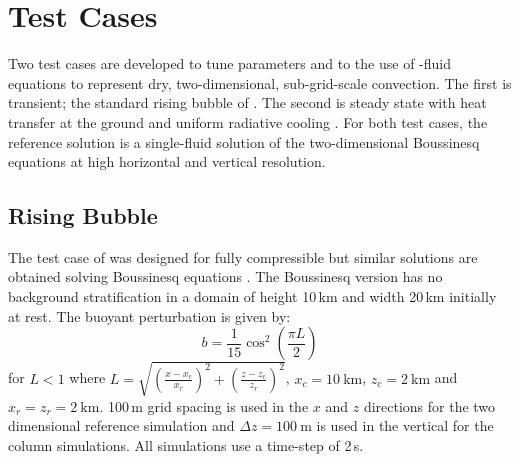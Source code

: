\documentclass[draft]{agujournal2019}
\begin{document}
\section{\label{sec:results} Test Cases}

Two test cases are developed to tune parameters and to  the
use of -fluid equations to represent dry, two-dimensional, sub-grid-scale
convection. The first is transient; the standard rising bubble of
.  The second  is steady state with heat transfer at
the ground and uniform radiative cooling . For both test cases, the
reference solution is a single-fluid solution of the two-dimensional
Boussinesq equations at high horizontal and vertical resolution.   

\subsection{Rising Bubble}

The  test case of  was designed for fully compressible
 but similar solutions are obtained solving  Boussinesq equations .
The Boussinesq version has no background stratification in a domain
of height 10\,km and width 20\,km initially at rest. The buoyant
perturbation is given by:
\begin{equation}
b=\frac{1}{15}\cos^{2}\left(\frac{\pi L}{2}\right)\label{eq:thetaPerturb}
\end{equation}
for $L<1$ where $L=\sqrt{\left(\frac{x-x_{c}}{x_{r}}\right)^{2}+\left(\frac{z-z_{c}}{z_{r}}\right)^{2}}$,
$x_{c}=10\ \text{km}$, $z_{c}=2\ \text{km}$ and $x_{r}=z_{r}=2\ \text{km}$.
100\,m grid spacing is used in the $x$ and $z$ directions for the
two dimensional reference simulation and $\Delta z=100\ \text{m}$
is used in the vertical for the  column simulations. All simulations
use a time-step of 2\,s.
\end{document}
